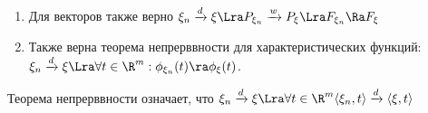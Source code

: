 \begin{note}
    \begin{enumerate}
        \item Для векторов также верно \(\xi_n \xrightarrow{d} \xi \Lra P_{\xi_n} \xrightarrow{w} P_\xi \Lra F_{\xi_n} \Ra F_\xi\)
        \item Также верна теорема непрерввности для характеристических функций: \(\xi_n \xrightarrow{d} \xi \Lra \forall t \in \R^m: \phi_{\xi_n}(t) \ra \phi_\xi(t)\).
    \end{enumerate}
\end{note}

\begin{note}
    Теорема непрерввности означает, что \(\xi_n \xrightarrow{d} \xi \Lra \forall t \in \R^m \langle \xi_n, t \rangle \xrightarrow{d} \langle \xi, t \rangle\)
\end{note}


